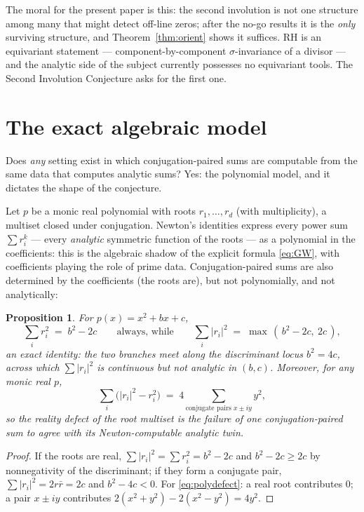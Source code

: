 \documentclass[11pt]{amsart}
\newtheorem{proposition}[theorem]{Proposition}
\theoremstyle{definition}
\theoremstyle{remark}
\begin{document}
The moral for the present paper is this: the second involution is not one structure among many that might detect off-line zeros; after the no-go results it is the \emph{only} surviving structure, and Theorem~\ref{thm:orient} shows it suffices. RH is an equivariant statement --- component-by-component $\sigma$-invariance of a divisor --- and the analytic side of the subject currently possesses no equivariant tools. The Second Involution Conjecture asks for the first one.

\section{The exact algebraic model}\label{sec:poly}

Does \emph{any} setting exist in which conjugation-paired sums are computable from the same data that computes analytic sums? Yes: the polynomial model, and it dictates the shape of the conjecture.

Let $p$ be a monic real polynomial with roots $r_1,\dots,r_d$ (with multiplicity), a multiset closed under conjugation. Newton's identities express every power sum $\sum r_i^k$ --- every \emph{analytic} symmetric function of the roots --- as a polynomial in the coefficients: this is the algebraic shadow of the explicit formula \eqref{eq:GW}, with coefficients playing the role of prime data. Conjugation-paired sums are also determined by the coefficients (the roots are), but not polynomially, and not analytically:

\begin{proposition}\label{prop:quadratic}
For $p(x)=x^2+bx+c$,
\[
\sum_i r_i^2 \;=\; b^2-2c \qquad\text{always, while}\qquad
\sum_i |r_i|^2 \;=\; \max\,(\,b^2-2c,\ 2c\,),
\]
an exact identity: the two branches meet along the discriminant locus $b^2=4c$, across which $\sum|r_i|^2$ is continuous but not analytic in $(b,c)$. Moreover, for any monic real $p$,
\begin{equation}\label{eq:polydefect}
\sum_i\big(|r_i|^2-r_i^2\big)\;=\;4\!\!\sum_{\text{conjugate pairs } x\pm iy}\!\! y^2,
\end{equation}
so the reality defect of the root multiset is the failure of one conjugation-paired sum to agree with its Newton-computable analytic twin.
\end{proposition}

\begin{proof}
If the roots are real, $\sum|r_i|^2=\sum r_i^2=b^2-2c$ and $b^2-2c\ge2c$ by nonnegativity of the discriminant; if they form a conjugate pair, $\sum|r_i|^2=2r\bar r=2c$ and $b^2-4c<0$. For \eqref{eq:polydefect}: a real root contributes $0$; a pair $x\pm iy$ contributes $2(x^2+y^2)-2(x^2-y^2)=4y^2$.
\end{proof}
\end{document}
